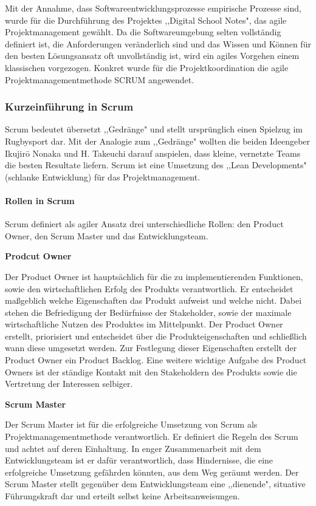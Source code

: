Mit der Annahme, dass Softwareentwicklungsprozesse empirische Prozesse sind, wurde für die Durchführung des Projektes ,,Digital School Notes", das agile Projektmanagement gewählt. Da die Softwareumgebung selten vollständig definiert ist, die Anforderungen veränderlich sind und das Wissen und Können für den besten Lösungsansatz oft unvollständig ist, wird ein agiles Vorgehen einem klassischen vorgezogen. Konkret wurde für die Projektkoordination die agile Projektmanagementmethode SCRUM angewendet.


\subsubsection{Kurzeinführung in Scrum}
Scrum bedeutet übersetzt ,,Gedränge" und stellt ursprünglich einen Spielzug im Rugbysport dar. Mit der Analogie zum ,,Gedränge" wollten die beiden Ideengeber  Ikujirō Nonaka und H. Takeuchi darauf anspielen, dass kleine, vernetzte Teams die besten Resultate liefern. Scrum ist eine Umsetzung des ,,Lean Developments" (schlanke Entwicklung) für das Projektmanagement.
\paragraph{Rollen in Scrum}
Scrum definiert als agiler Ansatz drei unterschiedliche Rollen: den Product Owner, den Scrum Master und das Entwicklungsteam.

\textbf{Prodcut Owner}

Der Product Owner ist hauptsächlich für die zu implementierenden Funktionen, sowie den wirtschaftlichen Erfolg des Produkts verantwortlich. Er entscheidet maßgeblich welche Eigenschaften das Produkt aufweist und welche nicht. Dabei stehen die Befriedigung der Bedürfnisse der Stakeholder, sowie der maximale wirtschaftliche Nutzen des Produktes im Mittelpunkt. Der Product Owner erstellt, priorisiert und entscheidet über die Produkteigenschaften und schließlich wann diese umgesetzt werden. Zur Festlegung dieser Eigenschaften erstellt der Product Owner ein Product Backlog. Eine weitere wichtige Aufgabe des Product Owners ist der ständige Kontakt mit den Stakeholdern des Produkts sowie die Vertretung der Interessen selbiger. 

\textbf{Scrum Master}

Der Scrum Master ist für die erfolgreiche Umsetzung von Scrum als Projektmanagementmethode verantwortlich. Er definiert die Regeln des Scrum und achtet auf deren Einhaltung. In enger Zusammenarbeit mit dem Entwicklungsteam ist er dafür verantwortlich, dass Hindernisse, die eine erfolgreiche Umsetzung gefährden könnten, aus dem Weg geräumt werden. Der Scrum Master stellt gegenüber dem Entwicklungsteam eine ,,dienende", situative Führungskraft dar und erteilt selbst keine Arbeitsanweisungen.

